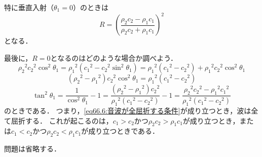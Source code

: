 特に垂直入射（$\theta_1=0$）のときは
\begin{equation}
    R = \left( \frac{\rho_2c_2 - \rho_1c_1}{\rho_2c_2 + \rho_1c_1} \right)^2
\end{equation}
となる．



最後に，$R=0$となるのはどのような場合か調べよう．
\[
    {\rho_2}^2{c_2}^2\cos^2\theta_1 = {\rho_1}^2 ({c_1}^2 - {c_2}^2 \sin^2\theta_1)
    = {\rho_1}^2 ({c_1}^2 - {c_2}^2) + {\rho_1}^2{c_2}^2\cos^2\theta_1
\]
\[
    ({\rho_2}^2-{\rho_1}^2){c_2}^2\cos^2\theta_1 = {\rho_1}^2 ({c_1}^2 - {c_2}^2)
\]
\begin{equation}\label{eq66.6:音波が全屈折する条件}
    \tan^2\theta_1 = \frac{1}{\cos^2\theta_1} -1
    = \frac{({\rho_2}^2-{\rho_1}^2){c_2}^2}{{\rho_1}^2 ({c_1}^2 - {c_2}^2)} -1
    = \frac{{\rho_2}^2{c_2}^2 - {\rho_1}^2{c_1}^2}{{\rho_1}^2 ({c_1}^2 - {c_2}^2)}
\end{equation}
のときである．
つまり，\eqref{eq66.6:音波が全屈折する条件}が成り立つとき，波は全て屈折する．
これが起こるのは，$c_1>c_2$かつ$\rho_2c_2>\rho_1c_1$が成り立つとき，または$c_1<c_2$かつ$\rho_2c_2<\rho_1c_1$が成り立つときである．





問題は省略する．


\BackToTheToc
